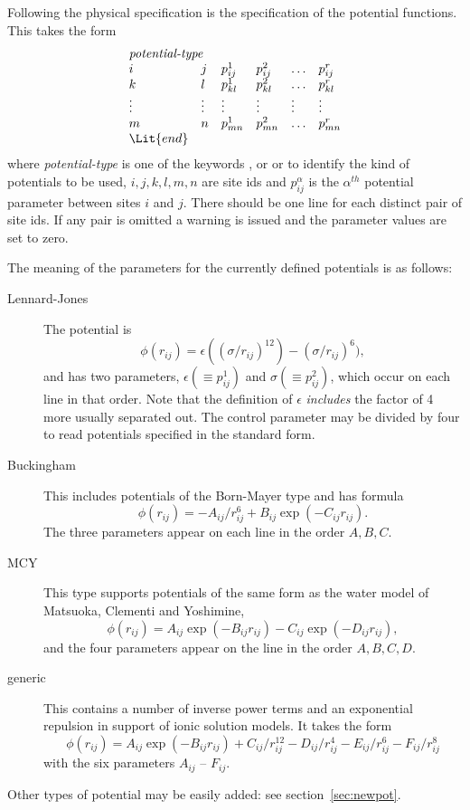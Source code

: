 \documentclass[a4paper,twoside]{report}
\newenvironment{Litdescription}{\begingroup%
     \renewcommand{\descriptionlabel}[1]{\Lit{##1}}\begin{description}}%
     {\end{description}\endgroup}
\begin{document}
Following the physical specification is the specification of the
potential functions. This takes the form
\begin{displaymath}
\begin{array}{llllll}
\multicolumn{4}{l}{\textit{potential-type}} \\
i & j & p^{1}_{ij} & p^{2}_{ij} & \ldots & p^{r}_{ij}  \\
k & l & p^{1}_{kl} & p^{2}_{kl} & \ldots & p^{r}_{kl}  \\
\vdots & \vdots & \vdots & \vdots & \vdots & \vdots \\
m & n & p^{1}_{mn} & p^{2}_{mn} & \ldots & p^{r}_{mn}  \\
\Lit{end} \\
\end{array}
\end{displaymath}
where \emph{potential-type} is one of the keywords
,  or  or
 to identify the kind of potentials to be used, $i, j,
k, l, m, n$ are site ids and $p^{\alpha}_{ij}$ is the $\alpha^{th}$
potential parameter between sites $i$ and $j$.  There should be one
line for each distinct pair of site ids.  If any pair is omitted a
warning is issued and the parameter values are set to zero.

The meaning of the parameters for the currently defined potentials is
as follows:
\begin{Litdescription}
\item[Lennard-Jones] The potential is 
\[\phi(r_{ij}) = \epsilon((\sigma/r_{ij})^{12}) -
(\sigma/r_{ij})^{6}),\] and has two parameters, $\epsilon ( \equiv p^{1}_{ij})$
and $\sigma ( \equiv p^{2}_{ij})$, which occur on each line in that
order.  Note that the definition of $\epsilon$ \emph{includes} the
factor of 4 more usually separated out.  The control parameter
 may be divided by four to read potentials
specified in the standard form.

\item[Buckingham] This includes potentials of the Born-Mayer type and
has formula \[\phi(r_{ij}) = -A_{ij}/r^{6}_{ij} + B_{ij}\exp(-C_{ij}r_{ij}).\]
The three parameters appear on each line in the order $A, B, C$.
\item[MCY] This type supports potentials of the same form as the water
model of Matsuoka, Clementi and Yoshimine\cite{matsuoka:75}, 
\[\phi(r_{ij}) = A_{ij}\exp(-B_{ij}r_{ij}) - C_{ij}\exp(-D_{ij}r_{ij}),\]
and the four parameters appear on the line in the order $A, B, C, D$.
\item[generic] This contains a number of inverse power terms and
  an exponential repulsion in support of ionic solution models.
  It takes the form
\[\phi(r_{ij}) = A_{ij} \exp(-B_{ij}r_{ij}) + C_{ij}/r_{ij}^{12} -
  D_{ij}/r_{ij}^4 -E_{ij}/r_{ij}^6 -F_{ij}/r_{ij}^8\]
with the six parameters $A_{ij}$ -- $F_{ij}$.
\end{Litdescription}
\noindent
Other types of potential may be easily added: see section~\ref{sec:newpot}.
\end{document}

